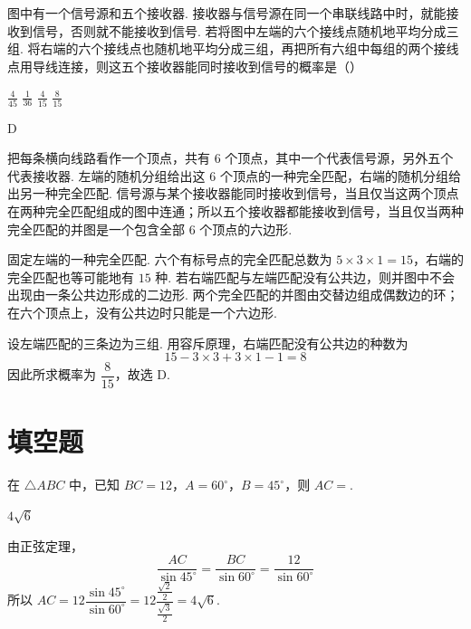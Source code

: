 \begin{problem}
图中有一个信号源和五个接收器. 接收器与信号源在同一个串联线路中时，就能接收到信号，否则就不能接收到信号. 若将图中左端的六个接线点随机地平均分成三组. 将右端的六个接线点也随机地平均分成三组，再把所有六组中每组的两个接线点用导线连接，则这五个接收器能同时接收到信号的概率是（\quad）


\choices
    {\(\frac{4}{45}\)}
    {\(\frac{1}{36}\)}
    {\(\frac{4}{15}\)}
    {\(\frac{8}{15}\)}
\end{problem}

\begin{answer}
D
\end{answer}

\begin{solution}
把每条横向线路看作一个顶点，共有 \(6\) 个顶点，其中一个代表信号源，另外五个代表接收器. 左端的随机分组给出这 \(6\) 个顶点的一种完全匹配，右端的随机分组给出另一种完全匹配. 信号源与某个接收器能同时接收到信号，当且仅当这两个顶点在两种完全匹配组成的图中连通；所以五个接收器都能接收到信号，当且仅当两种完全匹配的并图是一个包含全部 \(6\) 个顶点的六边形.

固定左端的一种完全匹配. 六个有标号点的完全匹配总数为 \(5\times3\times1=15\)，右端的完全匹配也等可能地有 \(15\) 种. 若右端匹配与左端匹配没有公共边，则并图中不会出现由一条公共边形成的二边形. 两个完全匹配的并图由交替边组成偶数边的环；在六个顶点上，没有公共边时只能是一个六边形.

设左端匹配的三条边为三组. 用容斥原理，右端匹配没有公共边的种数为
\[
15-3\times3+3\times1-1=8
\]
因此所求概率为 \(\dfrac{8}{15}\)，故选 D.
\end{solution}

\section{填空题}
\begin{problem}
在 \(\triangle ABC\) 中，已知 \(BC = 12\)，\(A = 60^{\circ}\)，\(B = 45^{\circ}\)，则 \(AC = \)\fillinblank{}.
\end{problem}

\begin{answer}
\(4\sqrt{6}\)
\end{answer}

\begin{solution}
由正弦定理，
\[
\frac{AC}{\sin45^{\circ}}=\frac{BC}{\sin60^{\circ}}=\frac{12}{\sin60^{\circ}}
\]
所以 \(AC=12\dfrac{\sin45^{\circ}}{\sin60^{\circ}}=12\dfrac{\frac{\sqrt2}{2}}{\frac{\sqrt3}{2}}=4\sqrt6\).
\end{solution}

